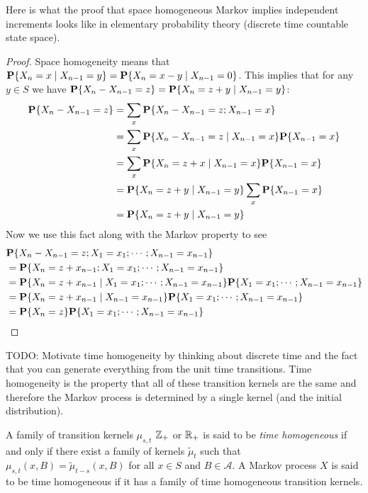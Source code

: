 Here is what the proof that space homogeneous Markov implies
independent increments looks like in elementary probability theory
(discrete time countable state space).
\begin{proof}
Space homogeneity means that $\cprobability{X_{n-1} = y}{X_n = x} =
\cprobability{X_{n-1} = 0}{X_n = x-y}$.  This implies that for any
$y\in S$ we have
$\probability{X_n - X_{n-1} = z} = \cprobability{X_{n-1} = y}{X_n =
  z+y}$:
\begin{align*}
\probability{X_n - X_{n-1} = z} &= \sum_x \probability{X_n - X_{n-1} =
  z ; X_{n-1}=x} \\
& =\sum_x \cprobability {X_{n-1}=x}{X_n - X_{n-1} =  z} \probability
{X_{n-1}=x} \\
& =\sum_x \cprobability {X_{n-1}=x}{X_n =  z+x} \probability
{X_{n-1}=x} \\
& =\cprobability {X_{n-1}=y}{X_n =  z+y} \sum_x \probability
{X_{n-1}=x} \\
&= \cprobability {X_{n-1}=y}{X_n =  z+y} 
\end{align*}
Now we use this fact along with the Markov property to see
\begin{align*}
&\probability{X_n - X_{n-1} = z; X_1=x_1 ; \cdots ; X_{n-1}=x_{n-1}} \\
&=\probability{X_n = z+x_{n-1}; X_1=x_1 ; \cdots ; X_{n-1}=x_{n-1}} \\
&=\cprobability{X_1=x_1 ; \cdots ; X_{n-1}=x_{n-1}}{X_n = z+x_{n-1}} 
\probability{X_1=x_1 ; \cdots ; X_{n-1}=x_{n-1}}\\
&=\cprobability{X_{n-1}=x_{n-1}}{X_n = z+x_{n-1}} 
\probability{X_1=x_1 ; \cdots ; X_{n-1}=x_{n-1}}\\
&=\probability{X_n = z} 
\probability{X_1=x_1 ; \cdots ; X_{n-1}=x_{n-1}}\\
\end{align*}
\end{proof}

TODO: Motivate time homogeneity by thinking about discrete time and
the fact that you can generate everything from the unit time
transitions.  Time homogeneity is the property that all of these
transition kernels are the same and therefore the Markov process is
determined by a single kernel (and the initial distribution).

\begin{defn}A family of transition kernels $\mu_{s,t}$  $\integers_+$ or $\reals_+$ is said to
  be \emph{time homogeneous} if and only if there exist a family of
  kernels $\tilde{\mu}_t$ such that $\mu_{s,t}(x, B) =
  \tilde{\mu}_{t-s}(x,B)$ for all $x \in S$ and $B \in \mathcal{A}$.
  A Markov process $X$ is said to be time homogeneous if it has a
  family of time homogeneous transition kernels.
\end{defn}

